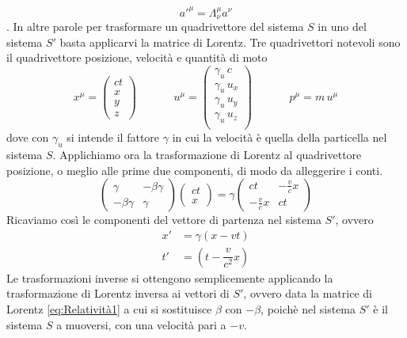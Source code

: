 \begin{equation}
a'^\mu = \Lambda_\nu^\mu a^\nu
\end{equation}
. In altre parole per trasformare un quadrivettore del sistema $S$ in uno del sistema $S'$ basta applicarvi la matrice di Lorentz. Tre quadrivettori notevoli sono il quadrivettore posizione, velocità e quantità di moto
\begin{equation}
x^\mu =
\begin{pmatrix}
ct \\
x\\
y\\
z
\end{pmatrix}
\,\,\,\,\,\,\,\,\,\,\,\,\,\,\,\,\,\,\,\,u^\mu =
\begin{pmatrix}
\gamma_u \, c \\
\gamma_u \, u_x \\
\gamma_u \, u_y \\
\gamma_u \, u_z \\
\end{pmatrix}
\,\,\,\,\,\,\,\,\,\,\,\,\,\,\,\,\,\,\,\,p^\mu = m\,u^\mu
\end{equation}
dove con $\gamma_u$ si intende il fattore $\gamma$ in cui la velocità è quella della particella nel sistema $S$. Applichiamo ora la trasformazione di Lorentz al quadrivettore posizione, o meglio alle prime due componenti, di modo da alleggerire i conti.
\begin{equation}
\begin{pmatrix}
\gamma & -\beta\gamma \\
-\beta\gamma & \gamma
\end{pmatrix} 
\begin{pmatrix}
ct \\
x
\end{pmatrix}
 = \gamma
\begin{pmatrix}
ct & -\frac{v}{c} x \\
-\frac{v}{c} x & ct
\end{pmatrix}
\end{equation}
Ricaviamo così le componenti del vettore di partenza nel sistema $S'$, ovvero
\begin{align}
x' &= \gamma(x-vt) \\
t' &= \left(t - \dfrac{v}{c^2}x\right)
\end{align}
Le trasformazioni inverse si ottengono semplicemente applicando la trasformazione di Lorentz inversa ai vettori di $S'$, ovvero data la matrice di Lorentz \ref{eq:Relatività1} a cui si sostituisce $\beta$ con $-\beta$, poichè nel sistema $S'$ è il sistema $S$ a muoversi, con una velocità pari a $-v$.

